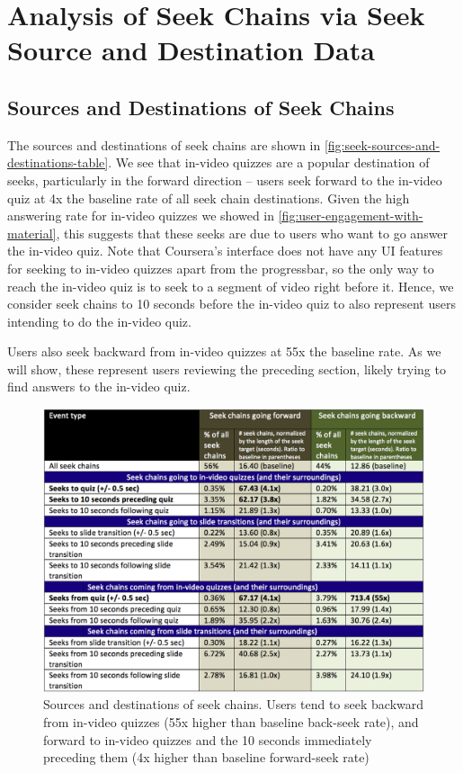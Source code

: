 \documentclass{sigchi}
\begin{document}
\section{Analysis of Seek Chains via Seek Source and Destination Data}

\subsection{Sources and Destinations of Seek Chains}

The sources and destinations of seek chains are shown in \autoref{fig:seek-sources-and-destinations-table}. We see that in-video quizzes are a popular destination of seeks, particularly in the forward direction -- users seek forward to the in-video quiz at 4x the baseline rate of all seek chain destinations. Given the high answering rate for in-video quizzes we showed in \autoref{fig:user-engagement-with-material}, this suggests that these seeks are due to users who want to go answer the in-video quiz. Note that Coursera's interface does not have any UI features for seeking to in-video quizzes apart from the progressbar, so the only way to reach the in-video quiz is to seek to a segment of video right before it. Hence, we consider seek chains to 10 seconds before the in-video quiz to also represent users intending to do the in-video quiz.

Users also seek backward from in-video quizzes at 55x the baseline rate. As we will show, these represent users reviewing the preceding section, likely trying to find answers to the in-video quiz.

\begin{figure}
\includegraphics[width=1.0\columnwidth]{seek-sources-and-destinations-table}
\caption{Sources and destinations of seek chains. Users tend to seek backward from in-video quizzes (55x higher than baseline back-seek rate), and forward to in-video quizzes and the 10 seconds immediately preceding them (4x higher than baseline forward-seek rate)}
\label{fig:seek-sources-and-destinations-table}
\end{figure}
\end{document}
